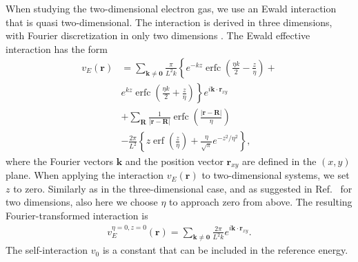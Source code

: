 \documentclass[aps,twocolumn,showpacs,floatfix,nofootinbib,preprintnumbers,superscriptaddress,amsmath,amssymb]{revtex4-1}
\DeclareMathOperator\erf{erf}
\DeclareMathOperator\erfc{erfc}
\begin{document}
When studying the two-dimensional electron gas, we
use an Ewald interaction that is quasi two-dimensional.
The interaction is derived in three dimensions, with 
Fourier discretization in only two dimensions 
\cite{wood2004}. The Ewald effective
interaction has the form \cite{wood2004}
\begin{align}
  v_{E}(\mathbf{r}) &= \sum_{\mathbf{k} \neq \mathbf{0}} 
  \frac{\pi }{L^{2}k}\left\{ e^{-kz} \erfc \left(
  \frac{\eta k}{2} - \frac{z}{\eta }\right)+ \right. \nonumber \\
  & \left. e^{kz}\erfc \left( \frac{\eta k}{2} + \frac{z}{\eta }
  \right) \right\} e^{i\mathbf{k}\cdot \mathbf{r}_{xy}} 
  \nonumber \\
  & + \sum_{\mathbf{R}}\frac{1}{\left| \mathbf{r}-\mathbf{R}
    \right| } \erfc \left( \frac{\left| \mathbf{r}-\mathbf{R}
    \right|}{\eta }\right) \nonumber \\
  & - \frac{2\pi}{L^{2}}\left\{ z\erf \left( \frac{z}{\eta }
  \right) + \frac{\eta }{\sqrt{\pi }}e^{-z^{2}/\eta^{2}}\right\},
\end{align}
where the Fourier vectors $\mathbf{k}$ and the position vector
$\mathbf{r}_{xy}$ are defined in the $(x,y)$ plane. When
applying the interaction $v_{E}(\mathbf{r})$ to two-dimensional
systems, we set $z$ to zero. Similarly as in the 
three-dimensional case, and as suggested in 
Ref.~\cite{drummond2008} for two dimensions, also here we 
choose $\eta $ to approach zero from above. The resulting 
Fourier-transformed interaction is
\begin{align}
  v_{E}^{\eta = 0, z = 0}(\mathbf{r}) = \sum_{\mathbf{k} \neq \mathbf{0}} 
  \frac{2\pi }{L^{2}k}e^{i\mathbf{k}\cdot \mathbf{r}_{xy}}. 
\end{align}
The self-interaction $v_{0}$ is a constant that can be 
included in the reference energy.
\end{document}
